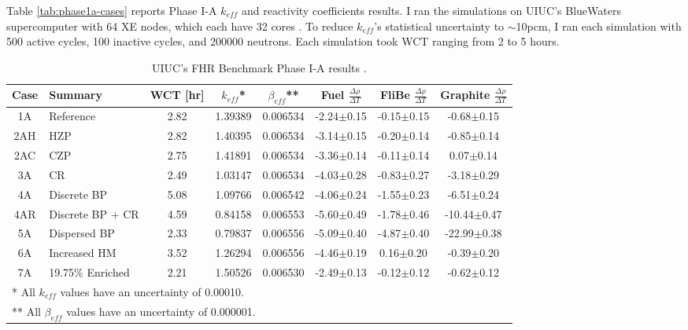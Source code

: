 Table \ref{tab:phase1a-cases} reports Phase I-A $k_{eff}$ and reactivity 
coefficients results. 
I ran the simulations on \gls{UIUC}'s BlueWaters supercomputer with 64 XE nodes, 
which each have 32 cores \cite{ncsa_about_2017}. 
To reduce $k_{eff}$'s statistical uncertainty to $\sim$10pcm, I ran each simulation 
with 500 active cycles, 100 inactive cycles, and 200000 neutrons. 
Each simulation took \gls{WCT} ranging from 2 to 5 hours. 
\begin{table}[H]
    \centering
    \onehalfspacing
    \caption{\acrlong{UIUC}'s \acrlong{FHR} Benchmark Phase I-A results 
    \cite{chee_arfcfhr-benchmark_2021}.}
	\label{tab:phase1a-results}
    \footnotesize
    \begin{tabular}{cp{2.7cm}cccccc}
    \hline
    \textbf{Case} & \textbf{Summary} & \textbf{WCT [hr]} & \textbf{$k_{eff}$}* & 
    \textbf{$\beta_{eff}$}** & 
    \textbf{Fuel} $\frac{\Delta \rho}{\Delta T}$ & 
    \textbf{FliBe} $\frac{\Delta \rho}{\Delta T}$ & 
    \textbf{Graphite} $\frac{\Delta \rho}{\Delta T}$\\
    \hline 
    1A & Reference &2.82&1.39389 & 0.006534 & -2.24$\pm$0.15 & -0.15$\pm$0.15 & -0.68$\pm$0.15\\
    2AH & \gls{HZP} &2.82&1.40395 & 0.006534 & -3.14$\pm$0.15 & -0.20$\pm$0.14 & -0.85$\pm$0.14\\
    2AC & \gls{CZP} &2.75&1.41891 & 0.006534 & -3.36$\pm$0.14 & -0.11$\pm$0.14 & 0.07$\pm$0.14\\
    3A & \gls{CR} &2.49&1.03147 & 0.006534 & -4.03$\pm$0.28 & -0.83$\pm$0.27 & -3.18$\pm$0.29\\
    4A & Discrete \gls{BP} &5.08&1.09766 & 0.006542 & -4.06$\pm$0.24 & -1.55$\pm$0.23 & -6.51$\pm$0.24\\
    4AR & Discrete \gls{BP} + \gls{CR} &4.59&0.84158 & 0.006553 & -5.60$\pm$0.49 & -1.78$\pm$0.46 & -10.44$\pm$0.47\\
    5A & Dispersed \gls{BP} &2.33&0.79837 & 0.006556 & -5.09$\pm$0.40 & -4.87$\pm$0.40 & -22.99$\pm$0.38\\
    6A & Increased \gls{HM} &3.52&1.26294 & 0.006556 & -4.46$\pm$0.19 & 0.16$\pm$0.20 & -0.39$\pm$0.20\\
    7A & 19.75\% Enriched &2.21&1.50526 & 0.006530 & -2.49$\pm$0.13 & -0.12$\pm$0.12 & -0.62$\pm$0.12\\
    \hline
    \multicolumn{5}{l}{* All $k_{eff}$ values have an uncertainty of 0.00010.} \\
    \multicolumn{5}{l}{** All $\beta_{eff}$ values have an uncertainty of 0.000001.} 
    \end{tabular}
\end{table}


